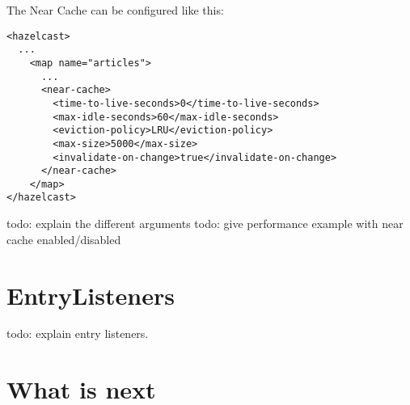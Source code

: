The Near Cache can be configured like this:
\begin{verbatim}
<hazelcast>
  ...
    <map name="articles">
      ...
      <near-cache>
        <time-to-live-seconds>0</time-to-live-seconds>
        <max-idle-seconds>60</max-idle-seconds>
        <eviction-policy>LRU</eviction-policy>
        <max-size>5000</max-size>
        <invalidate-on-change>true</invalidate-on-change>
      </near-cache>
    </map>
</hazelcast>
\end{verbatim}

todo: explain the different arguments
todo: give performance example with near cache enabled/disabled


\section{EntryListeners}

todo: explain entry listeners.

\section{What is next}
